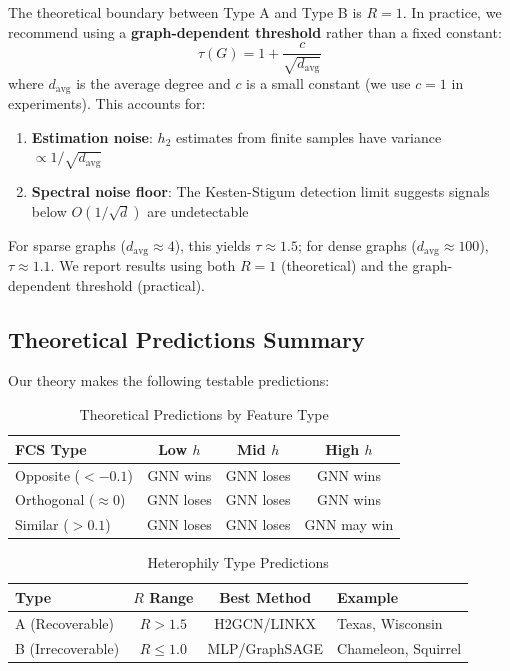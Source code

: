 \begin{remark}
\label{rem:threshold_empirical}
The theoretical boundary between Type A and Type B is $R = 1$. In practice, we recommend using a \textbf{graph-dependent threshold} rather than a fixed constant:
\begin{equation}
    \tau(G) = 1 + \frac{c}{\sqrt{d_{\text{avg}}}}
\end{equation}
where $d_{\text{avg}}$ is the average degree and $c$ is a small constant (we use $c = 1$ in experiments). This accounts for:
\begin{enumerate}
    \item \textbf{Estimation noise}: $h_2$ estimates from finite samples have variance $\propto 1/\sqrt{d_{\text{avg}}}$
    \item \textbf{Spectral noise floor}: The Kesten-Stigum detection limit suggests signals below $O(1/\sqrt{d})$ are undetectable
\end{enumerate}
For sparse graphs ($d_{\text{avg}} \approx 4$), this yields $\tau \approx 1.5$; for dense graphs ($d_{\text{avg}} \approx 100$), $\tau \approx 1.1$. We report results using both $R = 1$ (theoretical) and the graph-dependent threshold (practical).
\end{remark}

\subsection{Theoretical Predictions Summary}

Our theory makes the following testable predictions:

\begin{table}[t]
\centering
\caption{Theoretical Predictions by Feature Type}
\label{tab:theory_predictions}
\begin{tabular}{@{}lccc@{}}
\toprule
\textbf{FCS Type} & \textbf{Low $h$} & \textbf{Mid $h$} & \textbf{High $h$} \\
\midrule
Opposite ($<-0.1$) & GNN wins & GNN loses & GNN wins \\
Orthogonal ($\approx 0$) & GNN loses & GNN loses & GNN wins \\
Similar ($>0.1$) & GNN loses & GNN loses & GNN may win \\
\bottomrule
\end{tabular}
\end{table}

\begin{table}[t]
\centering
\caption{Heterophily Type Predictions}
\label{tab:heterophily_predictions}
\begin{tabular}{@{}lccl@{}}
\toprule
\textbf{Type} & \textbf{$R$ Range} & \textbf{Best Method} & \textbf{Example} \\
\midrule
A (Recoverable) & $R > 1.5$ & H2GCN/LINKX & Texas, Wisconsin \\
B (Irrecoverable) & $R \leq 1.0$ & MLP/GraphSAGE & Chameleon, Squirrel \\
\bottomrule
\end{tabular}
\end{table}

